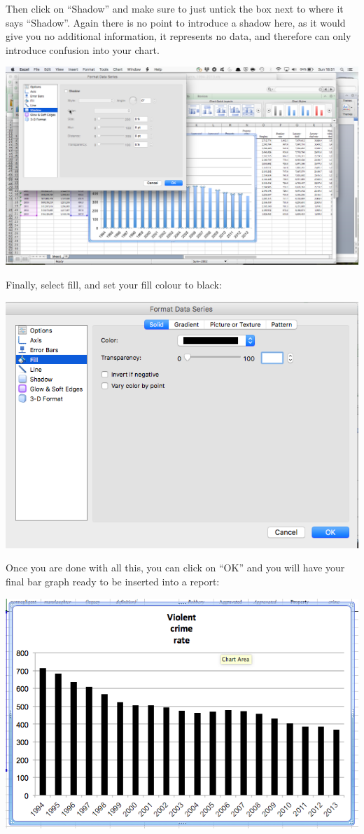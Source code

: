 \documentclass[
]{book}
\begin{document}
Then click on ``Shadow'' and make sure to just untick the box next to where it says ``Shadow''. Again there is no point to introduce a shadow here, as it would give you no additional information, it represents no data, and therefore can only introduce confusion into your chart.

\includegraphics{imgs/desc_viz_12.png}

Finally, select fill, and set your fill colour to black:

\includegraphics{imgs/desc_viz_13.png}

Once you are done with all this, you can click on ``OK'' and you will have your final bar graph ready to be inserted into a report:

\includegraphics{imgs/final_bar.png}
\end{document}
